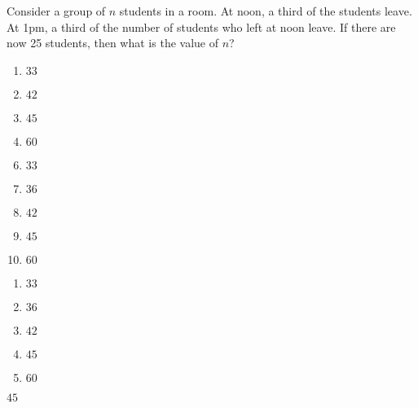 

 Consider a group of $n$ students in a room.  At noon, a third of the students leave.  At 1pm, a third of the number of students who left at noon leave.  If there are now 25 students, then what is the value of $n$?


\ifsat
	\begin{enumerate}[label=\Alph*)]
		\item   $33$
		\item  $42$
		\item  $45$%
		\item  $60$
	\end{enumerate}
\else
\fi

\ifacteven
	\begin{enumerate}[label=\textbf{\Alph*.},itemsep=\fill,align=left]
		\setcounter{enumii}{5}
		\item   $33$
		\item  $36$
		\item  $42$
		\addtocounter{enumii}{1}
		\item  $45$%
		\item  $60$
	\end{enumerate}
\else
\fi

\ifactodd
	\begin{enumerate}[label=\textbf{\Alph*.},itemsep=\fill,align=left]
		\item   $33$
		\item  $36$
		\item  $42$
		\item  $45$%
		\item  $60$
	\end{enumerate}
\else
\fi

\ifgridin
  $45$%
		
\else
\fi

